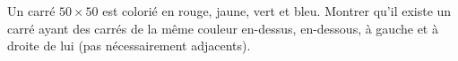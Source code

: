 Un carré $50 \times 50$ est colorié en rouge, jaune, vert et bleu. Montrer qu'il existe un carré ayant des carrés de la même couleur en-dessus, en-dessous, à gauche et à droite de lui (pas nécessairement adjacents).
